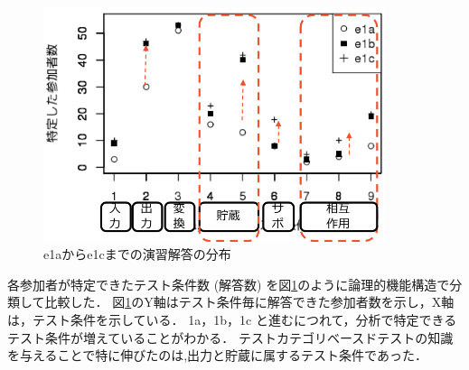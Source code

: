 \begin{figure}[htbp]
  \begin{center}
  \includegraphics[width=10cm]{./image/D-3-Fig12-1.png}
  \caption{e1aからe1cまでの演習解答の分布}
  \label{fig:D-3-Fig12-1}
  \end{center}
\end{figure}
各参加者が特定できたテスト条件数 (解答数) を図\ref{fig:D-3-Fig12-1}のように論理的機能構造で分類して比較した．
図\ref{fig:D-3-Fig12-1}のY軸はテスト条件毎に解答できた参加者数を示し，X軸は，テスト条件を示している．
1a，1b，1c と進むにつれて，分析で特定できるテスト条件が増えていることがわかる．
テストカテゴリベースドテストの知識を与えることで特に伸びたのは,出力と貯蔵に属するテスト条件であった．


